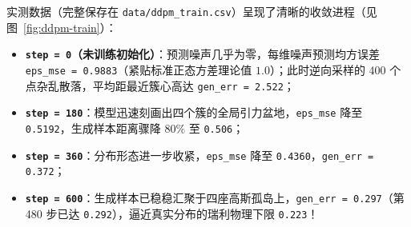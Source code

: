 实测数据（完整保存在 \texttt{data/ddpm\_train.csv}）呈现了清晰的收敛进程（见图~\ref{fig:ddpm-train}）：
\begin{itemize}
  \item \textbf{\texttt{step = 0}（未训练初始化）}：预测噪声几乎为零，每维噪声预测均方误差 \texttt{eps\_mse = 0.9883}（紧贴标准正态方差理论值 $1.0$）；此时逆向采样的 400 个点杂乱散落，平均距最近簇心高达 \texttt{gen\_err = 2.522}；
  \item \textbf{\texttt{step = 180}}：模型迅速刻画出四个簇的全局引力盆地，\texttt{eps\_mse} 降至 \texttt{0.5192}，生成样本距离骤降 $80\%$ 至 \texttt{0.506}；
  \item \textbf{\texttt{step = 360}}：分布形态进一步收紧，\texttt{eps\_mse} 降至 \texttt{0.4360}，\texttt{gen\_err = 0.372}；
  \item \textbf{\texttt{step = 600}}：生成样本已稳稳汇聚于四座高斯孤岛上，\texttt{gen\_err = 0.297}（第 480 步已达 \texttt{0.292}），逼近真实分布的瑞利物理下限 \texttt{0.223}！
\end{itemize}


